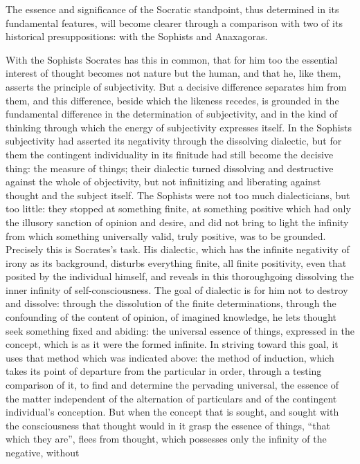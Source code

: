 The essence and significance of the Socratic standpoint, thus determined in its fundamental features, will become clearer through a comparison with two of its historical presuppositions: with the Sophists and Anaxagoras.

With the Sophists Socrates has this in common, that for him too the
essential interest of thought becomes not nature but
the human, and that he, like them, asserts the principle of subjectivity. But a decisive difference separates him from them, and this difference, beside which the likeness recedes, is grounded in the fundamental difference in the determination of subjectivity, and in the kind of thinking through which the energy of subjectivity expresses itself. In the Sophists subjectivity had asserted its negativity
through the dissolving dialectic, but for them the contingent
individuality in its finitude had still become the decisive thing: the measure of things; their dialectic turned dissolving and
destructive against the whole of objectivity, but not infinitizing and liberating against thought and the subject itself. The Sophists
were not too much dialecticians, but too little: they stopped
at something finite, at something positive which had only the illusory sanction of opinion and
desire, and did not bring to light the infinity from which something universally valid, truly
positive, was to be grounded. Precisely this is Socrates's task.
His dialectic, which has the infinite negativity of irony as its background, disturbs everything finite, all finite positivity, even that
posited by the individual himself, and reveals in this thoroughgoing
dissolving the inner infinity of self-consciousness. The goal of dialectic
is for him not to destroy and dissolve: through
the dissolution of the finite determinations, through the confounding of the content of opinion, of imagined knowledge, he lets
thought seek something fixed and abiding: the universal essence of things, expressed in the concept, which is as it were the formed infinite. In
striving toward this goal, it uses that method
which was indicated above: the method of induction, which takes
its point of departure from the particular in order, through a testing
comparison of it, to find and determine the pervading universal, the essence of the matter independent of the alternation of particulars and of the contingent individual's conception. But when the concept that is sought, and sought with the consciousness that thought would in
it grasp the essence of things, ``that which they are'', flees
from thought, which possesses only the infinity of the negative, without
